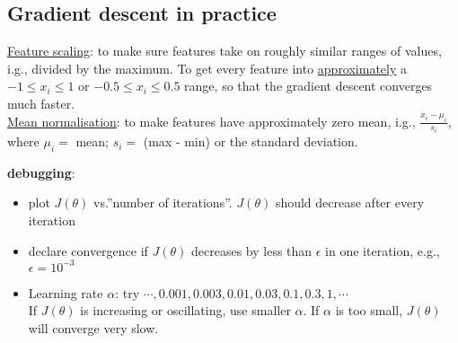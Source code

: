 \subsection{Gradient descent in practice}
\underline{Feature scaling}: to make sure features take on roughly similar ranges of values, i.g., divided by the maximum. To get every feature into \underline{approximately} a $-1 \leq x_i \leq 1$ or $-0.5 \leq x_i \leq 0.5$ range, so that the gradient descent converges much faster. \\
\underline{Mean normalisation}: to make features have approximately zero mean, i.g., $\frac{x_i - \mu_i}{s_i}$, where $\mu_i =$ mean; $s_i =$ (max - min) or the standard deviation.

\textbf{debugging}:
\begin{itemize}
\item plot $J(\theta)$ vs.''number of iterations''.  $J(\theta)$ should decrease after every iteration
\item declare convergence if $J(\theta)$ decreases by less than $\epsilon$ in one iteration, e.g., $\epsilon = 10^{-3}$
\item Learning rate $\alpha$: try $\cdots,  0.001, 0.003, 0.01, 0.03, 0.1, 0.3, 1, \cdots$\\
If  $J(\theta)$  is increasing or oscillating, use smaller $\alpha$. If $\alpha$ is too small,  $J(\theta)$ will converge very slow. 
\end{itemize}

%
